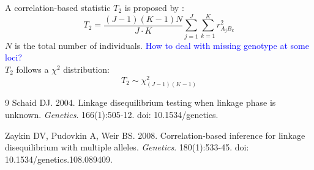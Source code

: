 \documentclass[12pt]{article}
\begin{document}
A correlation-based statistic $T_2$ is proposed by \cite{Zaykin2008}: 
$$T_2 = \frac{(J-1)(K-1)N}{J \cdot K}\sum_{j=1}^J\sum_{k=1}^K r_{A_jB_k}^2$$
$N$ is the total number of individuals. \textcolor{blue}{How to deal with missing genotype at some loci?}\\

$T_2$ follows a $\chi^2$ distribution: $$T_2 \sim \chi^2_{(J-1)(K-1)}$$

\begin{thebibliography}{9}
    Schaid DJ.
    2004.
    Linkage disequilibrium testing when linkage phase is unknown.
    \emph{Genetics}.
    166(1):505-12.
    doi: 10.1534/genetics.

    Zaykin DV, Pudovkin A, Weir BS. 
    2008.
    Correlation-based inference for linkage disequilibrium with multiple alleles. 
    \emph{Genetics}.
    180(1):533-45. 
    doi: 10.1534/genetics.108.089409.
\end{thebibliography}
\end{document}

